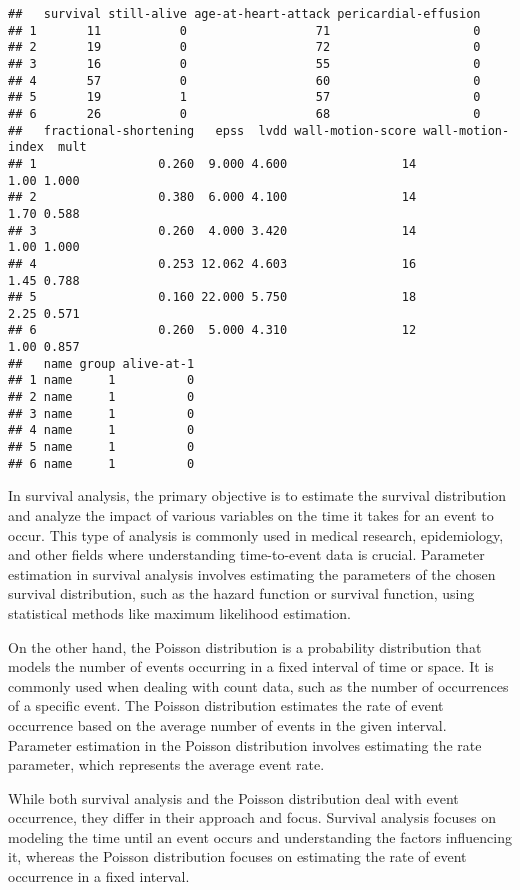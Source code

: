 \documentclass[
]{article}
\begin{document}
\begin{verbatim}
##   survival still-alive age-at-heart-attack pericardial-effusion
## 1       11           0                  71                    0
## 2       19           0                  72                    0
## 3       16           0                  55                    0
## 4       57           0                  60                    0
## 5       19           1                  57                    0
## 6       26           0                  68                    0
##   fractional-shortening   epss  lvdd wall-motion-score wall-motion-index  mult
## 1                 0.260  9.000 4.600                14              1.00 1.000
## 2                 0.380  6.000 4.100                14              1.70 0.588
## 3                 0.260  4.000 3.420                14              1.00 1.000
## 4                 0.253 12.062 4.603                16              1.45 0.788
## 5                 0.160 22.000 5.750                18              2.25 0.571
## 6                 0.260  5.000 4.310                12              1.00 0.857
##   name group alive-at-1
## 1 name     1          0
## 2 name     1          0
## 3 name     1          0
## 4 name     1          0
## 5 name     1          0
## 6 name     1          0
\end{verbatim}

In survival analysis, the primary objective is to estimate the survival
distribution and analyze the impact of various variables on the time it
takes for an event to occur. This type of analysis is commonly used in
medical research, epidemiology, and other fields where understanding
time-to-event data is crucial. Parameter estimation in survival analysis
involves estimating the parameters of the chosen survival distribution,
such as the hazard function or survival function, using statistical
methods like maximum likelihood estimation.

On the other hand, the Poisson distribution is a probability
distribution that models the number of events occurring in a fixed
interval of time or space. It is commonly used when dealing with count
data, such as the number of occurrences of a specific event. The Poisson
distribution estimates the rate of event occurrence based on the average
number of events in the given interval. Parameter estimation in the
Poisson distribution involves estimating the rate parameter, which
represents the average event rate.

While both survival analysis and the Poisson distribution deal with
event occurrence, they differ in their approach and focus. Survival
analysis focuses on modeling the time until an event occurs and
understanding the factors influencing it, whereas the Poisson
distribution focuses on estimating the rate of event occurrence in a
fixed interval.
\end{document}
